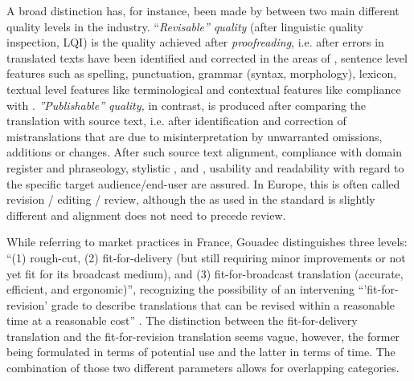 \documentclass[output=paper]{langsci/langscibook}
\begin{document}
A broad distinction has, for instance, been made by \citet{Williams2004} between two main different quality levels in the industry. ``\textit{Revisable'' quality} (after linguistic quality inspection, LQI) is the quality achieved after \textit{proofreading}, i.e. after errors in translated texts have been identified and corrected in the areas of , sentence level features such as spelling, punctuation, grammar (syntax, morphology), lexicon, textual level features like terminological  and contextual features like compliance with . \textit{''Publishable'' quality,} in contrast, is produced after comparing the translation with source text, i.e. after identification and correction of mistranslations that are due to misinterpretation by unwarranted omissions, additions or changes. After such source text alignment, compliance with domain register and phraseology, stylistic , and , usability and readability with regard to the specific target audience/end-user are assured. In Europe, this is often called revision / editing / review, although the  as used in the \citet{ISO2015} standard is slightly different and alignment does not need to precede review.

While referring to market practices in France, Gouadec distinguishes three levels: ``(1) rough-cut, (2) fit-for-delivery (but still requiring minor improvements or not yet fit for its broadcast medium), and (3) fit-for-broadcast translation (accurate, efficient, and ergonomic)'', recognizing the possibility of an intervening ``'fit-for-revision’ grade to describe translations that can be revised within a reasonable time at a reasonable cost'' \citep{Gouadec2010}. The distinction between the fit-for-delivery translation and the fit-for-revision translation seems vague, however, the former being formulated in terms of potential use and the latter in terms of time. The combination of those two different parameters allows for overlapping categories.
\end{document}
